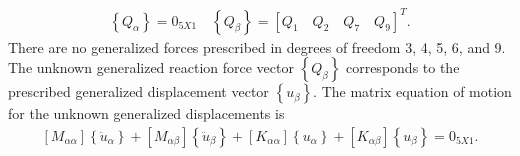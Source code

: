 \documentclass{AeroStructure-ERJohnson}
\begin{document}
\begin{example}
\begin{gather}
\left\{Q_{\alpha}\right\}=0_{5 X 1} \quad\left\{Q_{\beta}\right\}=\left[Q_{1}\quad Q_{2}\quad Q_{7}\quad Q_{9}\right]^{T}.\label{ex18.5h}
\end{gather}
There are no generalized forces prescribed in degrees of freedom 3, 4, 5, 6, and 9. The unknown generalized reaction force vector $\left\{Q_{\beta}\right\}$ corresponds to the prescribed generalized displacement vector $\left\{u_{\beta}\right\}$. The matrix equation of motion for the unknown generalized displacements is
\begin{align*}
\left[M_{\alpha \alpha}\right]\left\{\ddot{u}_{\alpha}\right\}+\left[M_{\alpha \beta}\right]\left\{\ddot{u}_{\beta}\right\}+\left[K_{\alpha \alpha}\right]\left\{u_{\alpha}\right\}+\left[K_{\alpha \beta}\right]\left\{u_{\beta}\right\}=0_{5 X 1}.
\end{align*}

\vspace*{-1pc}


\end{example}
\end{document}
